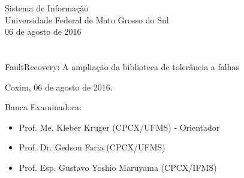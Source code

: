 \vskip 0.5cm
\begin{center}
Sistema de Informação\\
Universidade Federal de Mato Grosso do Sul\\
06 de agosto de 2016
\end{center}
		

\chapter*{}

\begin{center}

\begin{minipage}[t]{10cm}
	\begin{center}
		\vspace{-2cm}
		{{\Large FaultRecovery: A ampliação da biblioteca de tolerância a falhas}}  
	\end{center}
\end{minipage}

\end{center}


\begin{flushright}
	\vspace{12cm}
	Coxim, 06 de agosto de 2016.
	
\end{flushright}

\vspace{2cm}
Banca Examinadora:

\begin{itemize}
	\item Prof. Me. Kleber Kruger (CPCX/UFMS) - Orientador
	\item Prof. Dr. Gedson Faria (CPCX/UFMS)
	\item Prof. Esp. Gustavo Yoshio Maruyama (CPCX/IFMS)
\end{itemize}
